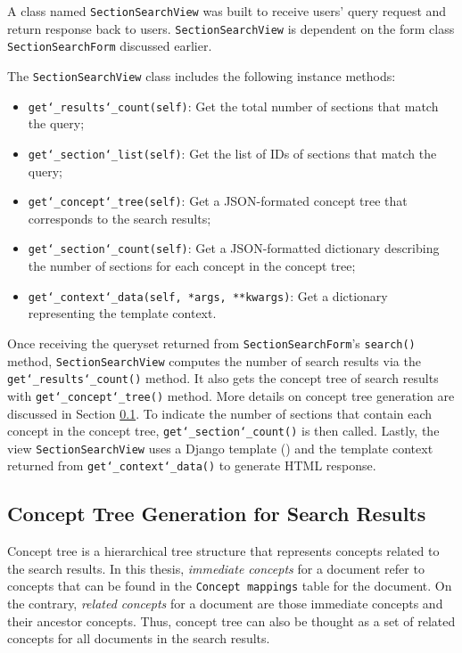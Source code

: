 A class named \texttt{SectionSearchView} was built to receive users' query request and return response back to users. \texttt{SectionSearchView} is dependent on the form class \texttt{SectionSearchForm} discussed earlier.

The \texttt{SectionSearchView} class includes the following instance methods:
\begin{itemize}
\item \texttt{get\char`_results\char`_count(self)}: Get the total number of sections that match the query;
\item \texttt{get\char`_section\char`_list(self)}: Get the list of IDs of sections that match the query;
\item \texttt{get\char`_concept\char`_tree(self)}: Get a JSON-formated concept tree that corresponds to the search results;
\item \texttt{get\char`_section\char`_count(self)}: Get a JSON-formatted dictionary describing the number of sections for each concept in the concept tree;
\item \texttt{get\char`_context\char`_data(self, *args, **kwargs)}: Get a dictionary representing the template context. 
\end{itemize}

Once receiving the queryset returned from \texttt{SectionSearchForm}'s \texttt{search()} method, \texttt{SectionSearchView} computes the number of search results via the \texttt{get\char`_results\char`_count()} method. It also  gets the concept tree of search results with \texttt{get\char`_concept\char`_tree()} method. More details on concept tree generation are discussed in Section \ref{subsec:concept_tree}. To indicate the number of sections that contain each concept in the concept tree, \texttt{get\char`_section\char`_count()} is then called. Lastly, the view \texttt{SectionSearchView} uses a Django template () and the template context returned from \texttt{get\char`_context\char`_data()} to generate HTML response.


\subsection{Concept Tree Generation for Search Results}
\label{subsec:concept_tree}
Concept tree is a hierarchical tree structure that represents concepts related to the search results. In this thesis, \textit{immediate concepts} for a document refer to concepts that can be found in the \texttt{Concept mappings} table for the document. On the contrary, \textit{related concepts} for a document are those immediate concepts and their ancestor concepts. Thus, concept tree can also be thought as a set of related concepts for all documents in the search results.

